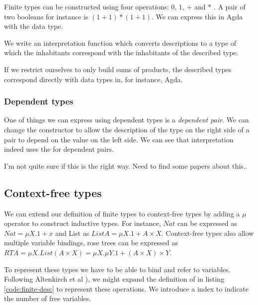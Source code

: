 Finite types can be constructed using four operations: $0$, $1$, $+$ and
$*$ \cite{altenkirch06}.
A pair of two booleans for instance is $(1 + 1) * (1 + 1)$.
We can express this in Agda with the  data type.


We write an interpretation function which converts descriptions to a
type of which the inhabitants correspond with the inhabitants of the
described type.


If we restrict ourselves to only build sums of products, the described
types correspond directly with data types in, for instance, Agda.

\subsubsection{Dependent types}

One of things we can express using dependent types is a
\emph{dependent pair}.
We can change the constructor  to allow the description of
the type on the right side of a pair to depend on the value on the
left side.
We can see that interpretation indeed uses the  for dependent pairs.


\begin{shaded}
  I'm not quite sure if this is the right way.
  Need to find some papers about this..
\end{shaded}

\subsection{Context-free types}

We can extend our definition of finite types to context-free types by
adding a $μ$ operator to construct inductive types.
For instance, $Nat$ can be expressed as $Nat = μX. 1 + x$ and List as $List
A = μX. 1 + A × X$.
Context-free types also allow multiple variable bindings, rose trees
can be expressed as $RT A = μX. List (A × X) = μX. μY. 1 + (A × X) × Y$.

To represent these types we have to be able to bind and refer to
variables.
Following Altenkirch et al \cite{altenkirch06}), we might expand the
definition of  in listing \ref{code:finite-desc} to represent
these operations.
We introduce a  index to indicate the number of free variables.

